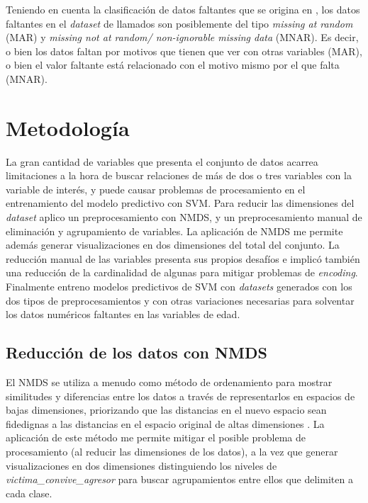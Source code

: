\documentclass[10 pt]{article}
\begin{document}
Teniendo en cuenta la clasificación de datos faltantes que se origina en \citet{rubin1976inference}, los datos faltantes en el \textit{dataset} de llamados son posiblemente del tipo \textit{missing at random} (MAR) y \textit{missing not at random/ non-ignorable missing data} (MNAR). Es decir, o bien los datos faltan por motivos que tienen que ver con otras variables (MAR), o bien el valor faltante está relacionado con el motivo mismo por el que falta (MNAR).    


\section{Metodología}\label{met}

La gran cantidad de variables que presenta el conjunto de datos acarrea limitaciones a la hora de buscar relaciones de más de dos o tres variables con la variable de interés, y puede causar problemas de procesamiento en el entrenamiento del modelo predictivo con SVM. Para reducir las dimensiones del \textit{dataset} aplico un preprocesamiento con NMDS, y un preprocesamiento manual de eliminación y agrupamiento de variables. La aplicación de NMDS me permite además generar visualizaciones en dos dimensiones del total del conjunto. La reducción manual de las variables presenta sus propios desafíos e implicó también una reducción de la cardinalidad de algunas para mitigar problemas de \textit{encoding}. Finalmente entreno modelos predictivos de SVM con \textit{datasets} generados con los dos tipos de preprocesamientos y con otras variaciones necesarias para solventar los datos numéricos faltantes en las variables de edad.


\subsection{Reducción de los datos con NMDS}

 El NMDS se utiliza a menudo como método de ordenamiento para mostrar similitudes y diferencias entre los datos a través de representarlos en espacios de bajas dimensiones, priorizando que las distancias en el nuevo espacio sean fidedignas a las distancias en el espacio original de altas dimensiones \citetext{\citealp{kruskal1964nonmetric}}. 
 La aplicación de este método me permite mitigar el posible problema de procesamiento (al reducir las dimensiones de los datos), a la vez que generar visualizaciones en dos dimensiones distinguiendo los niveles de \textit{victima\_convive\_agresor} para buscar agrupamientos entre ellos que delimiten a cada clase.
\end{document}
